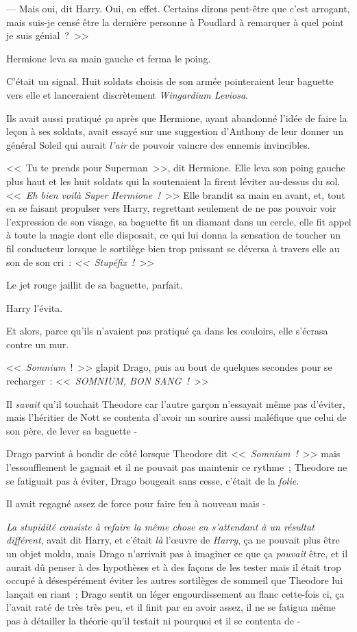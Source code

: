 --- Mais oui, dit Harry. Oui, en effet. Certains dirons peut-être que c'est arrogant, mais suis-je censé être la dernière personne à Poudlard à remarquer à quel point je suis génial~?~>>

Hermione leva sa main gauche et ferma le poing.

C'était un signal. Huit soldats choisis de son armée pointeraient leur baguette vers elle et lanceraient discrètement \emph{Wingardium Leviosa}.

Ils avait aussi pratiqué \emph{ça} après que Hermione, ayant abandonné l'idée de faire la leçon à ses soldats, avait essayé sur une suggestion d'Anthony de leur donner un général Soleil qui aurait \emph{l'air} de pouvoir vaincre des ennemis invincibles.

<<~Tu te prends pour Superman~>>, dit Hermione. Elle leva son poing gauche plus haut et les huit soldats qui la soutenaient la firent léviter au-dessus du sol. <<~\emph{Eh bien voilà Super Hermione~!}~>> Elle brandit sa main en avant, et, tout en se faisant propulser vers Harry, regrettant seulement de ne pas pouvoir voir l'expression de son visage, sa baguette fit un diamant dans un cercle, elle fit appel à toute la magie dont elle disposait, ce qui lui donna la sensation de toucher un fil conducteur lorsque le sortilège bien trop puissant se déversa à travers elle au son de son cri~: \emph{<<~Stupéfix~!}~>>

Le jet rouge jaillit de sa baguette, parfait.

Harry l'évita.

Et alors, parce qu'ils n'avaient pas pratiqué ça dans les couloirs, elle s'écrasa contre un mur.

\later

<<~\emph{Somnium}~!~>> glapit Drago, puis au bout de quelques secondes pour se recharger~: <<~\emph{SOMNIUM, BON SANG~!}~>>

Il \emph{savait} qu'il touchait Theodore car l'autre garçon n'essayait même pas d'éviter, mais l'héritier de Nott se contenta d'avoir un sourire aussi maléfique que celui de son père, de lever sa baguette -

Drago parvint à bondir de côté lorsque Theodore dit <<~\emph{Somnium~!}~>> mais l'essoufflement le gagnait et il ne pouvait pas maintenir ce rythme~; Theodore ne se fatiguait pas à éviter, Drago bougeait sans cesse, c'était de la \emph{folie}.

Il avait regagné assez de force pour faire feu à nouveau mais -

\emph{La stupidité consiste à refaire la même chose en s'attendant à un résultat différent}, avait dit Harry, et c'était \emph{là} l'œuvre de \emph{Harry}, ça ne pouvait plus être un objet moldu, mais Drago n'arrivait pas à imaginer ce que ça \emph{pouvait} être, et il aurait dû penser à des hypothèses et à des façons de les tester mais il était trop occupé à désespérément éviter les autres sortilèges de sommeil que Theodore lui lançait en riant~; Drago sentit un léger engourdissement au flanc cette-fois ci, ça l'avait raté de très très peu, et il finit par en avoir assez, il ne se fatigua même pas à détailler la théorie qu'il testait ni pourquoi et il se contenta de -

